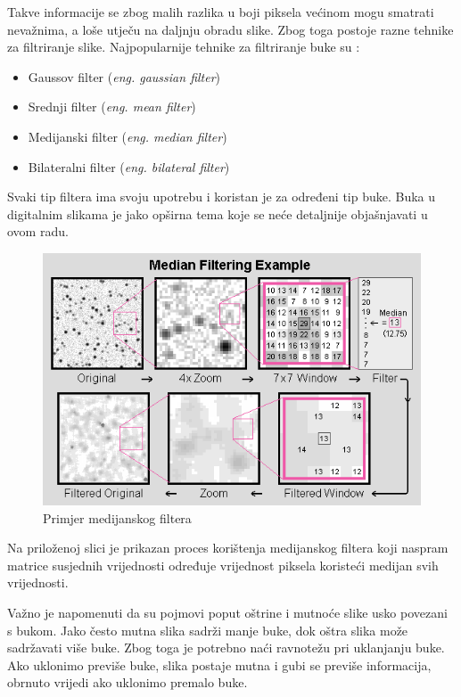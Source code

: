 \documentclass{foi}
\begin{document}
Takve informacije se zbog malih razlika u boji piksela većinom mogu smatrati nevažnima, a loše utječu na daljnju obradu slike. Zbog toga postoje razne tehnike za filtriranje slike. Najpopularnije tehnike za filtriranje buke su \cite{Swain2023Jul}:

\begin{itemize}
    \item Gaussov filter (\textit{eng. gaussian filter})
    \item Srednji filter (\textit{eng. mean filter})
    \item Medijanski filter (\textit{eng. median filter})
    \item Bilateralni filter (\textit{eng. bilateral filter})
\end{itemize}


Svaki tip filtera ima svoju upotrebu i koristan je za određeni tip buke. Buka u digitalnim slikama je jako opširna tema koje se neće detaljnije objašnjavati u ovom radu.

\begin{figure}[H]
    \centering
    \includegraphics[width=0.85\linewidth]{slike/MedianFiltering.png}
    \caption{Primjer medijanskog filtera \cite{MeidanFilter}}
\end{figure}

Na priloženoj slici je prikazan proces korištenja medijanskog filtera koji naspram matrice susjednih vrijednosti određuje vrijednost piksela koristeći medijan svih vrijednosti.

Važno je napomenuti da su pojmovi poput oštrine i mutnoće  slike usko povezani s bukom. Jako često mutna slika sadrži manje buke, dok oštra slika može sadržavati više buke. Zbog toga je potrebno naći ravnotežu pri uklanjanju buke. Ako uklonimo previše buke, slika postaje mutna i gubi se previše informacija, obrnuto vrijedi ako uklonimo premalo buke.
\end{document}
